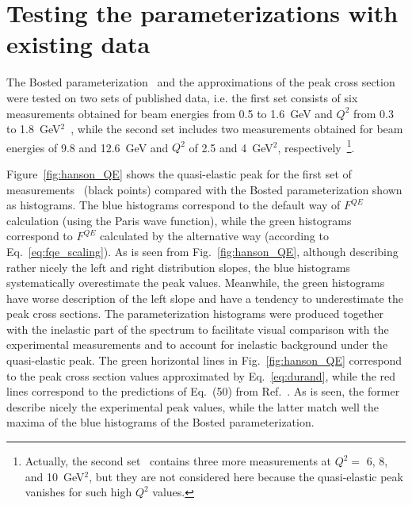 \newpage
\chapter{Testing the parameterizations with existing data}
\mbox{}\vspace{-\baselineskip}





The Bosted parameterization~\cite{Bosted_fit,Bosted:2007xd} and the approximations of the peak cross section~\cite{Durand:1961zz,Kocevar:1967} were tested on two sets of published data, i.e. the first set consists of six measurements obtained for beam energies from 0.5 to 1.6~GeV and $Q^{2}$ from 0.3 to 1.8~GeV$^2$~\cite{Hanson:1973vf}, while the second set includes two measurements obtained for beam energies of 9.8 and 12.6~GeV and $Q^{2}$ of 2.5 and 4~GeV$^2$, respectively~\cite{Rock:1991jy,Rock_SLAC}\footnote[5]{Actually, the second set~\cite{Rock:1991jy,Rock_SLAC} contains three more measurements at $Q^{2} = $ 6, 8, and 10~GeV$^2$, but they are not considered here because the quasi-elastic peak vanishes for such high $Q^2$ values.}. %

Figure~\ref{fig:hanson_QE} shows the quasi-elastic peak for the first set of measurements~\cite{Hanson:1973vf} (black points) compared with the Bosted parameterization shown as histograms. The blue histograms correspond to the default way of $F^{QE}$ calculation (using the Paris wave function), while the green histograms correspond to $F^{QE}$ calculated by the alternative way (according to Eq.~\eqref{eq:fqe_scaling}). As is seen from Fig.~\ref{fig:hanson_QE}, although describing rather nicely the left and right distribution slopes, the blue histograms systematically overestimate the peak values. Meanwhile, the green histograms have worse description of the left slope and have a tendency to underestimate the peak cross sections. The parameterization histograms were produced together with the inelastic part of the spectrum to facilitate visual comparison with the experimental measurements and to account for inelastic background under the quasi-elastic peak. The green horizontal lines in Fig.~\ref{fig:hanson_QE} correspond to the peak cross section values approximated by Eq.~\eqref{eq:durand}, while the red lines correspond to the predictions of Eq.~(50) from Ref.~\cite{Kocevar:1967}. As is seen, the former describe nicely the experimental peak values, while the latter match well the maxima of the blue histograms of the Bosted parameterization.

